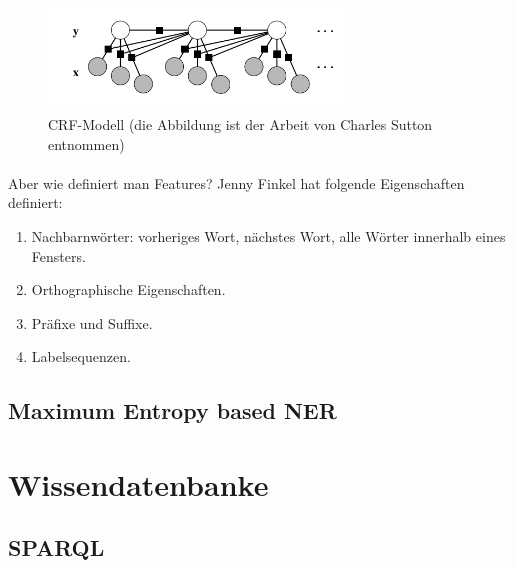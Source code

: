 \begin{figure}[ht]
\vbox{\small}
\includegraphics[width=0.7\textwidth]{Bilder/crf-modell-charles-andrew}
\caption{CRF-Modell (die Abbildung ist der Arbeit von Charles Sutton \cite{Charles/Andrew:10} entnommen)}
\label{fig:CRF-Modell}
\end{figure}

\paragraph{}

\paragraph{}
Aber wie definiert man Features?  Jenny Finkel\cite{Jenny/etal:07} hat folgende Eigenschaften definiert:
\begin{enumerate}
\item Nachbarnwörter: vorheriges Wort, nächstes Wort, alle Wörter innerhalb eines Fensters.
\item Orthographische Eigenschaften.
\item Präfixe und Suffixe.
\item Labelsequenzen.
\end{enumerate}

\subsection{Maximum Entropy based NER}

\section{Wissendatenbanke}
\subsection{SPARQL}
